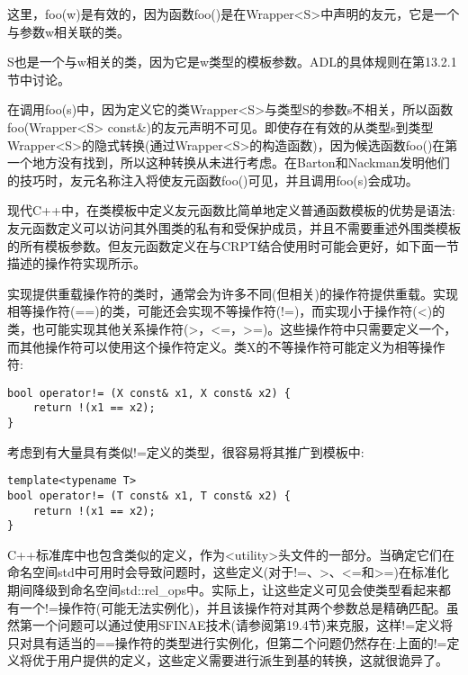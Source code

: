 这里，foo(w)是有效的，因为函数foo()是在Wrapper<S>中声明的友元，它是一个与参数w相关联的类。

\begin{tcolorbox}[colback=webgreen!5!white,colframe=webgreen!75!black]
\hspace*{0.75cm}S也是一个与w相关的类，因为它是w类型的模板参数。ADL的具体规则在第13.2.1节中讨论。
\end{tcolorbox}

在调用foo(s)中，因为定义它的类Wrapper<S>与类型S的参数s不相关，所以函数foo(Wrapper<S> const\&)的友元声明不可见。即使存在有效的从类型s到类型Wrapper<S>的隐式转换(通过Wrapper<S>的构造函数)，因为候选函数foo()在第一个地方没有找到，所以这种转换从未进行考虑。在Barton和Nackman发明他们的技巧时，友元名称注入将使友元函数foo()可见，并且调用foo(s)会成功。

现代C++中，在类模板中定义友元函数比简单地定义普通函数模板的优势是语法:友元函数定义可以访问其外围类的私有和受保护成员，并且不需要重述外围类模板的所有模板参数。但友元函数定义在与CRPT结合使用时可能会更好，如下面一节描述的操作符实现所示。


实现提供重载操作符的类时，通常会为许多不同(但相关)的操作符提供重载。实现相等操作符(==)的类，可能还会实现不等操作符(!=)，而实现小于操作符(<)的类，也可能实现其他关系操作符(>，<=，>=)。这些操作符中只需要定义一个，而其他操作符可以使用这个操作符定义。类X的不等操作符可能定义为相等操作符:

\begin{lstlisting}[style=styleCXX]
bool operator!= (X const& x1, X const& x2) {
	return !(x1 == x2);
}
\end{lstlisting}

考虑到有大量具有类似!=定义的类型，很容易将其推广到模板中:

\begin{lstlisting}[style=styleCXX]
template<typename T>
bool operator!= (T const& x1, T const& x2) {
	return !(x1 == x2);
}
\end{lstlisting}

C++标准库中也包含类似的定义，作为<utility>头文件的一部分。当确定它们在命名空间std中可用时会导致问题时，这些定义(对于!=、>、<=和>=)在标准化期间降级到命名空间std::rel\_ops中。实际上，让这些定义可见会使类型看起来都有一个!=操作符(可能无法实例化)，并且该操作符对其两个参数总是精确匹配。虽然第一个问题可以通过使用SFINAE技术(请参阅第19.4节)来克服，这样!=定义将只对具有适当的==操作符的类型进行实例化，但第二个问题仍然存在:上面的!=定义将优于用户提供的定义，这些定义需要进行派生到基的转换，这就很诡异了。

